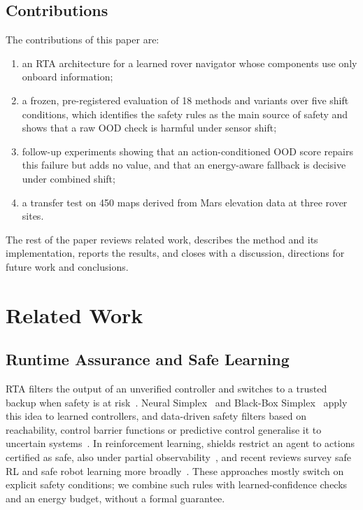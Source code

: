 \documentclass[conference]{IEEEtran}
\begin{document}
\subsection{Contributions}
The contributions of this paper are:
\begin{enumerate}
\item an RTA architecture for a learned rover navigator whose components use only onboard information;
\item a frozen, pre-registered evaluation of 18 methods and variants over five shift conditions, which identifies the
safety rules as the main source of safety and shows that a raw OOD check is harmful under sensor shift;
\item follow-up experiments showing that an action-conditioned OOD score repairs this failure but adds no value, and that
an energy-aware fallback is decisive under combined shift;
\item a transfer test on 450 maps derived from Mars elevation data at three rover sites.
\end{enumerate}
The rest of the paper reviews related work, describes the method and its implementation, reports the results, and
closes with a discussion, directions for future work and conclusions.

\section{Related Work}
\subsection{Runtime Assurance and Safe Learning}
RTA filters the output of an unverified controller and switches to a trusted backup when safety is at
risk~\cite{hobbs2023rta}. Neural Simplex~\cite{phan2020neuralsimplex} and Black-Box Simplex~\cite{mehmood2022bbsimplex}
apply this idea to learned controllers, and data-driven safety filters based on reachability, control barrier functions
or predictive control generalise it to uncertain systems~\cite{wabersich2023safety}. In reinforcement learning, shields
restrict an agent to actions certified as safe, also under partial observability~\cite{carr2023pomdpshield}, and recent
reviews survey safe RL and safe robot learning more broadly~\cite{gu2024saferl,brunke2022saferobot}. These approaches
mostly switch on explicit safety conditions; we combine such rules with learned-confidence checks and an energy budget,
without a formal guarantee.
\end{document}
